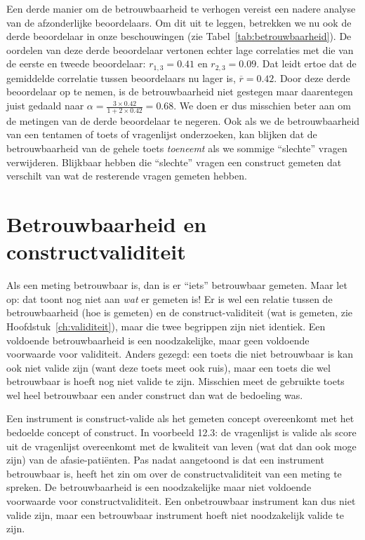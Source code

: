 \documentclass[
]{book}
\begin{document}
Een derde manier om de betrouwbaarheid te verhogen vereist een nadere
analyse van de afzonderlijke beoordelaars. Om dit uit te leggen,
betrekken we nu ook de derde beoordelaar in onze beschouwingen (zie
Tabel~\ref{tab:betrouwbaarheid}). De oordelen van deze derde
beoordelaar vertonen echter lage correlaties met die van de eerste en
tweede beoordelaar: \(r_{1,3}=0.41\) en \(r_{2,3}=0.09\). Dat leidt ertoe
dat de gemiddelde correlatie tussen beoordelaars nu lager is,
\(\overline{r}=0.42\). Door deze derde beoordelaar op te nemen, is de
betrouwbaarheid niet gestegen maar daarentegen juist gedaald naar
\(\alpha = \frac{3\times0.42}{1+2\times0.42} = 0.68\). We doen er dus
misschien beter aan om de metingen van de derde beoordelaar te negeren.
Ook als we de betrouwbaarheid van een tentamen of toets of vragenlijst
onderzoeken, kan blijken dat de betrouwbaarheid van de gehele toets
\emph{toeneemt} als we sommige ``slechte'' vragen verwijderen. Blijkbaar hebben
die ``slechte'' vragen een construct gemeten dat verschilt van wat de
resterende vragen gemeten hebben.

\hypertarget{betrouwbaarheid-en-constructvaliditeit}{%
\section{Betrouwbaarheid en constructvaliditeit}\label{betrouwbaarheid-en-constructvaliditeit}}

Als een meting betrouwbaar is, dan is er ``iets'' betrouwbaar gemeten.
Maar let op: dat toont nog niet aan \emph{wat} er gemeten is! Er is wel een
relatie tussen de betrouwbaarheid (hoe is gemeten) en de
construct-validiteit (wat is gemeten, zie
Hoofdstuk~\ref{ch:validiteit}), maar die twee begrippen zijn niet identiek.
Een voldoende betrouwbaarheid is een noodzakelijke, maar geen voldoende
voorwaarde voor validiteit. Anders gezegd: een toets die niet
betrouwbaar is kan ook niet valide zijn (want deze toets meet ook ruis),
maar een toets die wel betrouwbaar is hoeft nog niet valide te zijn.
Misschien meet de gebruikte toets wel heel betrouwbaar een ander
construct dan wat de bedoeling was.

Een instrument is construct-valide als het gemeten concept overeenkomt
met het bedoelde concept of construct. In
voorbeeld 12.3: de vragenlijst is valide als score uit de
vragenlijst overeenkomt met de kwaliteit van leven (wat dat dan ook moge
zijn) van de afasie-patiënten. Pas nadat aangetoond is dat een
instrument betrouwbaar is, heeft het zin om over de constructvaliditeit
van een meting te spreken. De betrouwbaarheid is een noodzakelijke maar
niet voldoende voorwaarde voor constructvaliditeit. Een onbetrouwbaar
instrument kan dus niet valide zijn, maar een betrouwbaar instrument
hoeft niet noodzakelijk valide te zijn.
\end{document}
